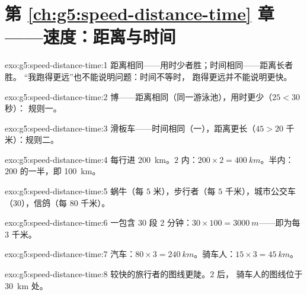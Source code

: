 \section*{第 \ref{ch:g5:speed-distance-time} 章——速度：距离与时间}

\begin{solution}{exo:g5:speed-distance-time:1}
距离相同——用时少者胜；时间相同——距离长者胜。
“我跑得更远”也不能说明问题：时间不等时，
跑得更远并不能说明更快。
\end{solution}

\begin{solution}{exo:g5:speed-distance-time:2}
博——距离相同（同一游泳池），用时更少（$25 < 30$ 秒）：
规则一。
\end{solution}

\begin{solution}{exo:g5:speed-distance-time:3}
滑板车——时间相同（一），距离更长（$45 > 20$
千米）：规则二。
\end{solution}

\begin{solution}{exo:g5:speed-distance-time:4}
每行进 \qty{200}{km}。$2$ 内：$200 \times 2
= \qty{400}{km}$。半内：$200$ 的一半，即 \qty{100}{km}。
\end{solution}

\begin{solution}{exo:g5:speed-distance-time:5}
蜗牛（每 $5$ 米），步行者（每 $5$ 千米），城市公交车
（$30$），信鸽（每 $80$ 千米）。
\end{solution}

\begin{solution}{exo:g5:speed-distance-time:6}
一包含 $30$ 段 $2$ 分钟：$30 \times 100 =
\qty{3000}{m}$——即为每 $3$ 千米。
\end{solution}

\begin{solution}{exo:g5:speed-distance-time:7}
汽车：$80 \times 3 = \qty{240}{km}$。骑车人：$15 \times 3 =
\qty{45}{km}$。
\end{solution}

\begin{solution}{exo:g5:speed-distance-time:8}
较快的旅行者的图线更陡。$2$ 后，
骑车人的图线位于 \qty{30}{km} 处。
\end{solution}

